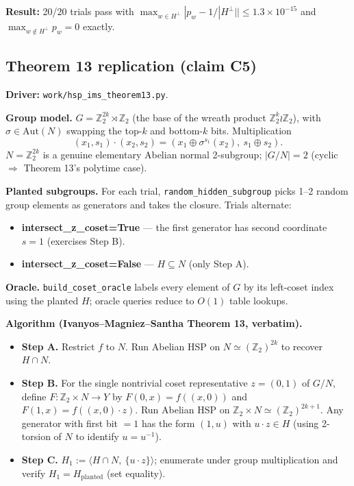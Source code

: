 \documentclass[11pt]{article}
\begin{document}
\textbf{Result:} 20/20 trials pass with
$\max_{w \in H^\perp}|p_w - 1/|H^\perp|| \le 1.3\times 10^{-15}$ and
$\max_{w \notin H^\perp} p_w = 0$ exactly.

\subsection{Theorem 13 replication (claim C5)}

\textbf{Driver:} \texttt{work/hsp\_ims\_theorem13.py}.

\textbf{Group model.} $G = \mathbb{Z}_2^{2k} \rtimes \mathbb{Z}_2$
(the base of the wreath product $\mathbb{Z}_2^k \wr \mathbb{Z}_2$),
with $\sigma \in \mathrm{Aut}(N)$ swapping the top-$k$ and bottom-$k$
bits. Multiplication
\[
  (x_1, s_1) \cdot (x_2, s_2) = (x_1 \oplus \sigma^{s_1}(x_2),\ s_1 \oplus s_2).
\]
$N = \mathbb{Z}_2^{2k}$ is a genuine elementary Abelian normal 2-subgroup;
$|G/N| = 2$ (cyclic $\Rightarrow$ Theorem 13's polytime case).

\textbf{Planted subgroups.} For each trial,
\texttt{random\_hidden\_subgroup} picks 1--2 random group elements as
generators and takes the closure. Trials alternate:
\begin{itemize}
  \item \textbf{intersect\_z\_coset=True} --- the first generator has second
        coordinate $s = 1$ (exercises Step B).
  \item \textbf{intersect\_z\_coset=False} --- $H \subseteq N$ (only Step A).
\end{itemize}

\textbf{Oracle.} \texttt{build\_coset\_oracle} labels every element of $G$
by its left-coset index using the planted $H$; oracle queries reduce to
$O(1)$ table lookups.

\textbf{Algorithm (Ivanyos--Magniez--Santha Theorem 13, verbatim).}
\begin{itemize}
  \item \textbf{Step A.} Restrict $f$ to $N$. Run Abelian HSP on
        $N \simeq (\mathbb{Z}_2)^{2k}$ to recover $H \cap N$.
  \item \textbf{Step B.} For the single nontrivial coset representative
        $z = (0,1)$ of $G/N$, define
        $F : \mathbb{Z}_2 \times N \to Y$ by $F(0,x) = f((x,0))$ and
        $F(1,x) = f((x,0)\cdot z)$. Run Abelian HSP on
        $\mathbb{Z}_2 \times N \simeq (\mathbb{Z}_2)^{2k+1}$.
        Any generator with first bit $=1$ has the form $(1, u)$ with
        $u \cdot z \in H$ (using 2-torsion of $N$ to identify $u = u^{-1}$).
  \item \textbf{Step C.} $H_1 := \langle H\cap N,\ \{u\cdot z\}\rangle$;
        enumerate under group multiplication and verify $H_1 = H_{\text{planted}}$
        (set equality).
\end{itemize}
\end{document}
